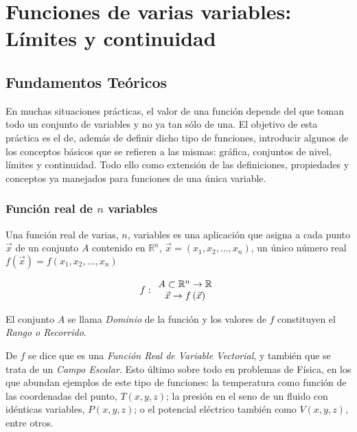 
\chapter{Funciones de varias variables:\\ Límites y continuidad}

\section*{Fundamentos Teóricos}
En muchas situaciones prácticas, el valor de una función depende
del que toman todo un conjunto de variables y no ya tan sólo de
una. El objetivo de esta práctica es el de, además de definir
dicho tipo de funciones, introducir algunos de los conceptos
básicos que se refieren a las mismas: gráfica, conjuntos de nivel,
límites y continuidad. Todo ello como extensión de las
definiciones, propiedades y conceptos ya manejados para funciones
de una única variable.

\subsection*{Función real de $n$ variables}
Una función real de varias, $n$, variables es una aplicación que
asigna a cada punto $\vec{x}$ de un conjunto $A$ contenido en
$\mathbb{R}^n$, $ \vec x  = \left( {x_1 ,x_2 ,...,x_n } \right)$,
un único número real $f\left( {\vec x } \right) = f\left( {x_1
,x_2 ,...,x_n } \right)$


\[
f:\begin{array}{*{20}c}
   {A \subset \mathbb{R}^n  \to \mathbb{R}}  \\
   {\vec x  \to f\left( {\vec x } \right)}  \\

 \end{array}
\]

El conjunto $A$ se llama \emph{Dominio} de la función y los
valores de $f$ constituyen el \emph{Rango o Recorrido}.

De $f$ se dice que es una \emph{Función Real de Variable
Vectorial}, y también que se trata de un \emph{Campo Escalar}.
Esto último sobre todo en problemas de Física, en los que abundan
ejemplos de este tipo de funciones: la temperatura como función de
las coordenadas del punto, $T(x,y,z)$; la presión en el seno de un
fluido con idénticas variables, $P(x,y,z)$; o el potencial
eléctrico también como $V(x,y,z)$, entre otros.

